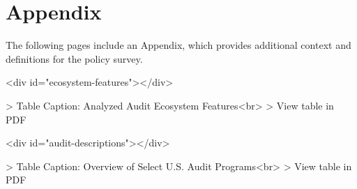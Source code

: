 \documentclass[sigconf]{acmart}
\begin{document}
\section{Appendix}

The following pages include an Appendix, which provides additional context and definitions for the policy survey.

\begin{table}<div id="ecosystem-features"></div>

> Table Caption: Analyzed Audit Ecosystem Features<br>
> View table in PDF
\end{table}


\begin{table}<div id="audit-descriptions"></div>

> Table Caption: Overview of Select U.S. Audit Programs<br>
> View table in PDF
\end{table}
\end{document}
